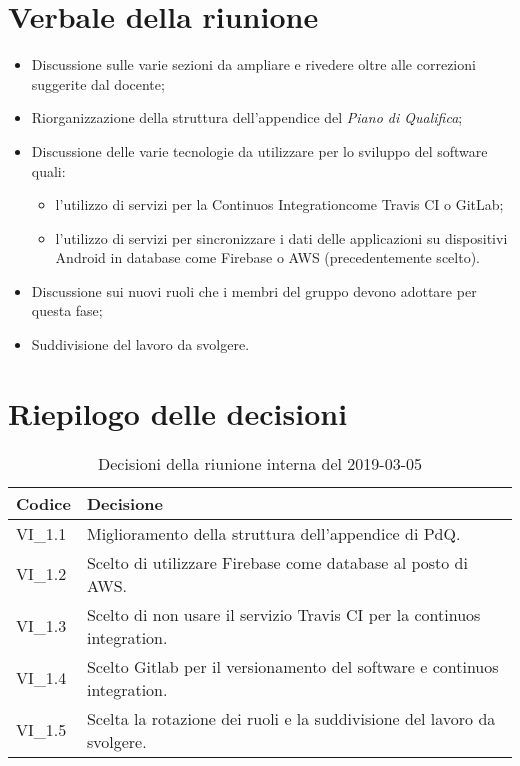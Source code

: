 \section{Verbale della riunione}
\begin{itemize}
	\item Discussione sulle varie sezioni da ampliare e rivedere oltre alle correzioni suggerite dal docente;
	\item Riorganizzazione della struttura dell'appendice del \textit{Piano di Qualifica};
	\item Discussione delle varie tecnologie da utilizzare per lo sviluppo del software quali:
		\begin{itemize}
			\item l'utilizzo di servizi per la Continuos Integration\glosp come Travis CI o GitLab\glo;
			\item l'utilizzo di servizi per sincronizzare i dati delle applicazioni su dispositivi Android in database come Firebase o AWS (precedentemente scelto).
		\end{itemize}
	\item Discussione sui nuovi ruoli che i membri del gruppo devono adottare per questa fase;
	\item Suddivisione del lavoro da svolgere.

\end{itemize} 
\pagebreak
\section{Riepilogo delle decisioni}

	
	\begin{longtable}{ >{\centering}p{} >{}p{}}
		\caption{Decisioni della riunione interna del 2019-03-05}\\	
		\rowcolorhead
		\textbf{\color{white}Codice} 
		& \centering\textbf{\color{white}Decisione} 
		\tabularnewline 
		\endfirsthead
		VI\_1.1 & Miglioramento della struttura dell'appendice di PdQ.
		
		\tabularnewline 
		VI\_1.2 & Scelto di utilizzare Firebase come database al posto di AWS.
		
		\tabularnewline 
		VI\_1.3 & Scelto di non usare il servizio Travis CI per la continuos integration.
	
		\tabularnewline 
		VI\_1.4 & Scelto Gitlab per il versionamento del software e continuos integration.
		
		\tabularnewline 
		VI\_1.5 & Scelta la rotazione dei ruoli e la suddivisione del lavoro da svolgere.
	
	\end{longtable}
	




